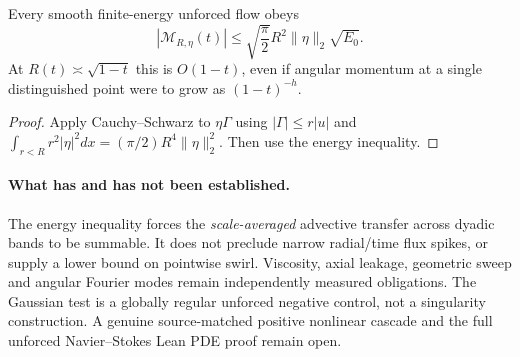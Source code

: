 \begin{proposition}
\label{prop:xxxix-moment-bound}
Every smooth finite-energy unforced flow obeys
\begin{equation}\label{eq:xxxix-moment-bound}
\boxed{
|\mathcal M_{R,\eta}(t)|
\le\sqrt{\frac{\pi}{2}}R^2\|\eta\|_2\sqrt{E_0}.
}
\end{equation}
At $R(t)\asymp\sqrt{1-t}$ this is $O(1-t)$,
even if angular momentum at a single distinguished
point were to grow as $(1-t)^{-h}$.
\end{proposition}
\begin{proof}
Apply Cauchy--Schwarz to $\eta\Gamma$
using $|\Gamma|\le r|u|$ and
$\int_{r<R}r^2|\eta|^2dx
=(\pi/2)R^4\|\eta\|_2^2$.
Then use the energy inequality.
\end{proof}

\paragraph{What has and has not been established.}
The energy inequality forces the \emph{scale-averaged}
advective transfer across dyadic bands to be summable.
It does not preclude narrow radial/time flux spikes,
or supply a lower bound on pointwise swirl. Viscosity,
axial leakage, geometric sweep and angular Fourier
modes remain independently measured obligations.
The Gaussian test is a globally regular unforced
negative control, not a singularity construction.
A genuine source-matched positive nonlinear cascade
and the full unforced Navier--Stokes Lean PDE proof
remain open.
